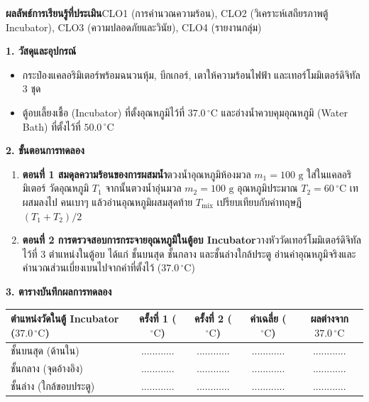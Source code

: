 \begin{labbox}
\noindent\textbf{ผลลัพธ์การเรียนรู้ที่ประเมิน}\quad CLO1 (การคำนวณความร้อน), CLO2 (วิเคราะห์เสถียรภาพตู้ Incubator), CLO3 (ความปลอดภัยและวินัย), CLO4 (รายงานกลุ่ม)

\vspace{4pt}
\noindent\textbf{1. วัสดุและอุปกรณ์}
\begin{itemize}
    \item กระป๋องแคลอริมิเตอร์พร้อมฉนวนหุ้ม, บีกเกอร์, เตาให้ความร้อนไฟฟ้า และเทอร์โมมิเตอร์ดิจิทัล 3 ชุด
    \item ตู้อบเลี้ยงเชื้อ (Incubator) ที่ตั้งอุณหภูมิไว้ที่ $37.0\,^\circ\text{C}$ และอ่างน้ำควบคุมอุณหภูมิ (Water Bath) ที่ตั้งไว้ที่ $50.0\,^\circ\text{C}$
\end{itemize}

\noindent\textbf{2. ขั้นตอนการทดลอง}
\begin{enumerate}
    \item \textbf{ตอนที่ 1 สมดุลความร้อนของการผสมน้ำ}\quad ตวงน้ำอุณหภูมิห้องมวล $m_1 = 100\text{ g}$ ใส่ในแคลอริมิเตอร์ วัดอุณหภูมิ $T_1$ จากนั้นตวงน้ำอุ่นมวล $m_2 = 100\text{ g}$ อุณหภูมิประมาณ $T_2 = 60\,^\circ\text{C}$ เทผสมลงไป คนเบาๆ แล้วอ่านอุณหภูมิผสมสุดท้าย $T_{\text{mix}}$ เปรียบเทียบกับค่าทฤษฎี $(T_1 + T_2)/2$
    \item \textbf{ตอนที่ 2 การตรวจสอบการกระจายอุณหภูมิในตู้อบ Incubator}\quad วางหัววัดเทอร์โมมิเตอร์ดิจิทัลไว้ที่ 3 ตำแหน่งในตู้อบ ได้แก่ ชั้นบนสุด ชั้นกลาง และชั้นล่างใกล้ประตู อ่านค่าอุณหภูมิจริงและคำนวณส่วนเบี่ยงเบนไปจากค่าที่ตั้งไว้ ($37.0\,^\circ\text{C}$)
\end{enumerate}

\noindent\textbf{3. ตารางบันทึกผลการทดลอง}
\begin{center}
\footnotesize\setlength{\tabcolsep}{3.5pt}
\begin{tabularx}{\linewidth}{>{\raggedright\arraybackslash}X c c c c}
\toprule
\textbf{ตำแหน่งวัดในตู้ Incubator ($37.0\,^\circ\text{C}$)} & \textbf{ครั้งที่ 1 ($^\circ\text{C}$)} & \textbf{ครั้งที่ 2 ($^\circ\text{C}$)} & \textbf{ค่าเฉลี่ย ($^\circ\text{C}$)} & \textbf{ผลต่างจาก $37.0\,^\circ\text{C}$} \\
\midrule
ชั้นบนสุด (ด้านใน) & ............ & ............ & ............ & ............ \\
ชั้นกลาง (จุดอ้างอิง) & ............ & ............ & ............ & ............ \\
ชั้นล่าง (ใกล้ขอบประตู) & ............ & ............ & ............ & ............ \\
\bottomrule
\end{tabularx}
\end{center}
\end{labbox}

